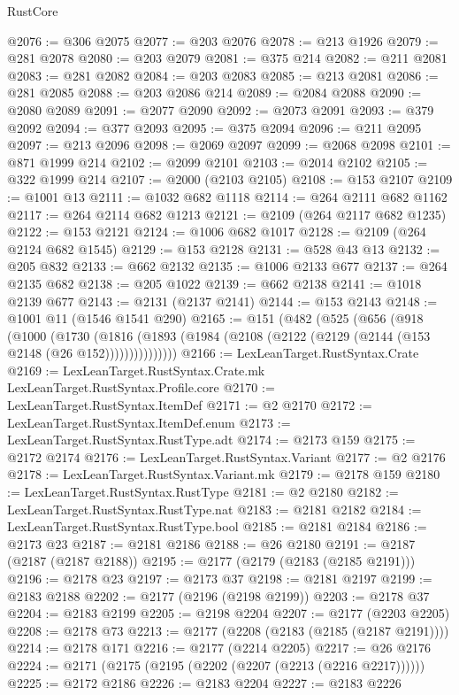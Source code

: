 \begin{lexlean}{RustCore}
\begin{coremodule}
@2076 := @306 @2075
@2077 := @203 @2076
@2078 := @213 @1926
@2079 := @281 @2078
@2080 := @203 @2079
@2081 := @375 @214
@2082 := @211 @2081
@2083 := @281 @2082
@2084 := @203 @2083
@2085 := @213 @2081
@2086 := @281 @2085
@2088 := @203 @2086 @214
@2089 := @2084 @2088
@2090 := @2080 @2089
@2091 := @2077 @2090
@2092 := @2073 @2091
@2093 := @379 @2092
@2094 := @377 @2093
@2095 := @375 @2094
@2096 := @211 @2095
@2097 := @213 @2096
@2098 := @2069 @2097
@2099 := @2068 @2098
@2101 := @871 @1999 @214
@2102 := @2099 @2101
@2103 := @2014 @2102
@2105 := @322 @1999 @214
@2107 := @2000 (@2103 @2105)
@2108 := @153 @2107
@2109 := @1001 @13
@2111 := @1032 @682 @1118
@2114 := @264 @2111 @682 @1162
@2117 := @264 @2114 @682 @1213
@2121 := @2109 (@264 @2117 @682 @1235)
@2122 := @153 @2121
@2124 := @1006 @682 @1017
@2128 := @2109 (@264 @2124 @682 @1545)
@2129 := @153 @2128
@2131 := @528 @43 @13
@2132 := @205 @832
@2133 := @662 @2132
@2135 := @1006 @2133 @677
@2137 := @264 @2135 @682
@2138 := @205 @1022
@2139 := @662 @2138
@2141 := @1018 @2139 @677
@2143 := @2131 (@2137 @2141)
@2144 := @153 @2143
@2148 := @1001 @11 (@1546 @1541 @290)
@2165 := @151
    (@482
      (@525
        (@656
          (@918
            (@1000
              (@1730
                (@1816
                  (@1893 (@1984 (@2108 (@2122 (@2129 (@2144 (@153 @2148 (@26 @152)))))))))))))))
@2166 := LexLeanTarget.RustSyntax.Crate
@2169 := LexLeanTarget.RustSyntax.Crate.mk LexLeanTarget.RustSyntax.Profile.core
@2170 := LexLeanTarget.RustSyntax.ItemDef
@2171 := @2 @2170
@2172 := LexLeanTarget.RustSyntax.ItemDef.enum
@2173 := LexLeanTarget.RustSyntax.RustType.adt
@2174 := @2173 @159
@2175 := @2172 @2174
@2176 := LexLeanTarget.RustSyntax.Variant
@2177 := @2 @2176
@2178 := LexLeanTarget.RustSyntax.Variant.mk
@2179 := @2178 @159
@2180 := LexLeanTarget.RustSyntax.RustType
@2181 := @2 @2180
@2182 := LexLeanTarget.RustSyntax.RustType.nat
@2183 := @2181 @2182
@2184 := LexLeanTarget.RustSyntax.RustType.bool
@2185 := @2181 @2184
@2186 := @2173 @23
@2187 := @2181 @2186
@2188 := @26 @2180
@2191 := @2187 (@2187 (@2187 @2188))
@2195 := @2177 (@2179 (@2183 (@2185 @2191)))
@2196 := @2178 @23
@2197 := @2173 @37
@2198 := @2181 @2197
@2199 := @2183 @2188
@2202 := @2177 (@2196 (@2198 @2199))
@2203 := @2178 @37
@2204 := @2183 @2199
@2205 := @2198 @2204
@2207 := @2177 (@2203 @2205)
@2208 := @2178 @73
@2213 := @2177 (@2208 (@2183 (@2185 (@2187 @2191))))
@2214 := @2178 @171
@2216 := @2177 (@2214 @2205)
@2217 := @26 @2176
@2224 := @2171 (@2175 (@2195 (@2202 (@2207 (@2213 (@2216 @2217))))))
@2225 := @2172 @2186
@2226 := @2183 @2204
@2227 := @2183 @2226

\end{coremodule}
\end{lexlean}
